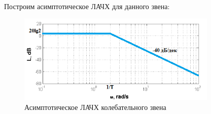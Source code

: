 \documentclass[a4paper, 11pt, russian]{article}
\begin{document}
    Построим асимптотическое ЛАЧХ для данного звена:
    \begin{figure}[ht!]
        \centering
        \includegraphics[width = 0.85\textwidth]{oscillatoryLinkAsymp}
        \caption{Асимптотическое ЛАЧХ колебательного звена}
    \end{figure}
    
    \clearpage
\end{document}
